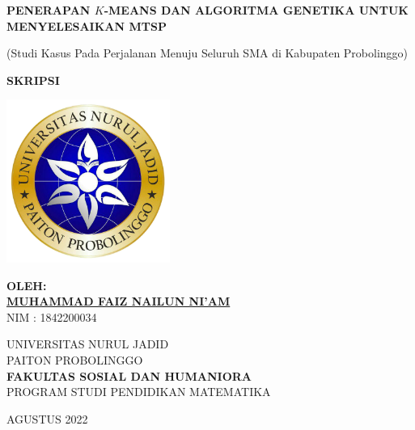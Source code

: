 \begin{titlepage}
   \begin{center}

       \textbf{PENERAPAN $K$-MEANS DAN ALGORITMA GENETIKA UNTUK MENYELESAIKAN MTSP}
       
       (Studi Kasus Pada Perjalanan Menuju Seluruh SMA di Kabupaten Probolinggo)

       \vfill
       \textbf{SKRIPSI}
       \vfill
       
       \includegraphics[width=0.4\textwidth]{Gambar/logo.png}
       
       \vfill
       
       \textbf{OLEH:}\\
       \textbf{\underline{MUHAMMAD FAIZ NAILUN NI'AM}}\\
       NIM : 1842200034

       \vfill
       
       UNIVERSITAS NURUL JADID\\
       PAITON PROBOLINGGO\\
       \textbf{FAKULTAS SOSIAL DAN HUMANIORA}\\       
       PROGRAM STUDI PENDIDIKAN MATEMATIKA\\
       
       \vfill       
       
       AGUSTUS 2022
       
   \end{center}
\end{titlepage}
